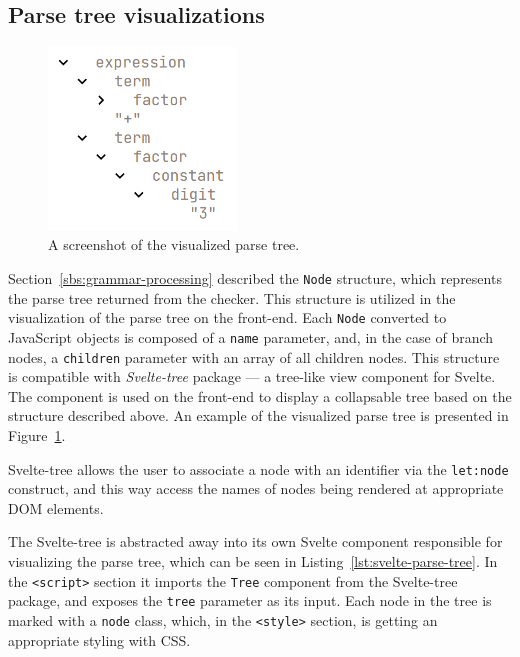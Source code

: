 \documentclass[english,bachelors,forcepolishlogotype]{wizthesis}
\begin{document}
\subsection{Parse tree visualizations}

\begin{figure}
  \centering
  \includegraphics[width=5cm]{parse_tree.png}
  \caption{A screenshot of the visualized parse tree.}
  \label{fig:front-end-parse-tree}
\end{figure}

Section~\ref{sbs:grammar-processing} described the \texttt{Node} structure,
which represents the parse tree returned from the checker. This structure is
utilized in the visualization of the parse tree on the front-end. Each
\texttt{Node} converted to JavaScript objects is composed of a \texttt{name}
parameter, and, in the case of branch nodes, a \texttt{children} parameter with
an array of all children nodes. This structure is compatible with
\emph{Svelte-tree} package --- a tree-like view component for Svelte. The
component is used on the front-end to display a collapsable tree based on the
structure described above. An example of the visualized parse tree is presented
in Figure~\ref{fig:front-end-parse-tree}.

Svelte-tree allows the user to associate a node with an identifier via the
\texttt{let:node} construct, and this way access the names of nodes being
rendered at appropriate DOM elements.

The Svelte-tree is abstracted away into its own Svelte component responsible for
visualizing the parse tree, which can be seen in
Listing~\ref{lst:svelte-parse-tree}. In the \texttt{<script>} section it imports
the \texttt{Tree} component from the Svelte-tree package, and exposes the
\texttt{tree} parameter as its input. Each node in the tree is marked with a
\texttt{node} class, which, in the \texttt{<style>} section, is getting an
appropriate styling with CSS.
\end{document}

